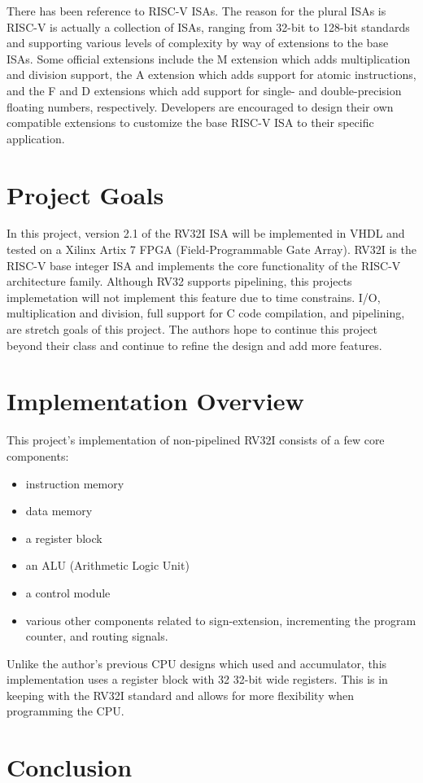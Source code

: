 \documentclass[lettersize,journal]{IEEEtran}
\begin{document}
There has been reference to RISC-V ISAs. The reason for the plural ISAs is RISC-V is actually a collection of ISAs, 
ranging from 32-bit to 128-bit standards and supporting various levels of complexity by way of extensions to the base ISAs. 
Some official extensions include the M extension which adds multiplication and division support, 
the A extension which adds support for atomic instructions, and the F and D extensions which add support for single- and double-precision floating numbers, 
respectively. Developers are encouraged to design their own compatible extensions to customize the base RISC-V ISA to their specific application. 

\section{Project Goals}
In this project, version 2.1 of the RV32I ISA will be implemented in VHDL and tested on a Xilinx Artix 7 FPGA (Field-Programmable Gate Array). 
RV32I is the RISC-V base integer ISA and implements the core functionality of the RISC-V architecture family. 
Although RV32 supports pipelining, this projects implemetation will not implement this feature due to time constrains. 
I/O, multiplication and division, full support for C code compilation, and pipelining, are stretch goals of this project. 
The authors hope to continue this project beyond their class and continue to refine the design and add more features.
 
\section{Implementation Overview}
This project's implementation of non-pipelined RV32I consists of a few core components:
\begin{itemize}
    \item instruction memory
    \item data memory
    \item a register block
    \item an ALU (Arithmetic Logic Unit)
    \item a control module
    \item various other components related to sign-extension, incrementing the program counter, and routing signals. 
\end{itemize}
Unlike the author's previous CPU designs which used and accumulator, this implementation uses a register block with 32 32-bit wide registers.
This is in keeping with the RV32I standard and allows for more flexibility when programming the CPU.

\section{Conclusion}
\color{red}{TBD}

\nocite{*}

\end{document}
